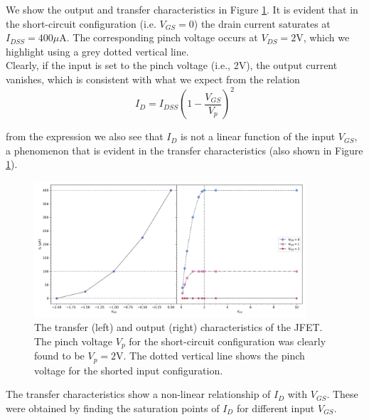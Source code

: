 \documentclass{article}
\begin{document}
	We show the output and transfer characteristics in Figure \ref{fig:out}. It is evident that in the short-circuit configuration (i.e. $V_{GS} = 0$) the drain current saturates at $I_{DSS} = 400\mu$A. The corresponding pinch voltage occurs at $V_{DS} = 2$V, which we highlight using a grey dotted vertical line.\\
	
	Clearly, if the input is set to the pinch voltage (i.e., 2V), the output current vanishes, which is consistent with what we expect from the relation\[ I_D = I_{DSS}\left( 1 - \frac{V_{GS}}{V_p} \right)^2 \]
	
	from the expression we also see that $I_D$ is not a linear function of the input $V_{GS}$, a phenomenon that is evident in the transfer characteristics (also shown in Figure \ref{fig:out}).
	
	\begin{figure}[h!]
		\centering
		\includegraphics[width=0.9\textwidth]{output_chars}
		\caption{The transfer (left) and output (right) characteristics of the JFET. The pinch voltage $V_p$ for the short-circuit configuration was clearly found to be $V_p = 2$V. The dotted vertical line shows the pinch voltage for the shorted input configuration.}
		\label{fig:out}
	\end{figure}

	
	The transfer characteristics show a non-linear relationship of $I_D$ with $V_{GS}$. These were obtained by finding the saturation points of $I_D$ for different input $V_{GS}$.
	
\end{document}
